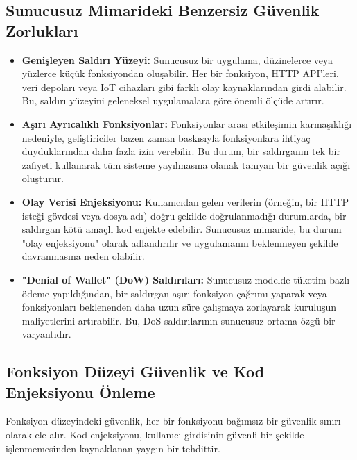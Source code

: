 \subsection{Sunucusuz Mimarideki Benzersiz Güvenlik Zorlukları}
\begin{itemize}
    \item \textbf{Genişleyen Saldırı Yüzeyi:} Sunucusuz bir uygulama, düzinelerce veya yüzlerce küçük fonksiyondan oluşabilir. Her bir fonksiyon, HTTP API'leri, veri depoları veya IoT cihazları gibi farklı olay kaynaklarından girdi alabilir. Bu, saldırı yüzeyini geleneksel uygulamalara göre önemli ölçüde artırır.
    \item \textbf{Aşırı Ayrıcalıklı Fonksiyonlar:} Fonksiyonlar arası etkileşimin karmaşıklığı nedeniyle, geliştiriciler bazen zaman baskısıyla fonksiyonlara ihtiyaç duyduklarından daha fazla izin verebilir. Bu durum, bir saldırganın tek bir zafiyeti kullanarak tüm sisteme yayılmasına olanak tanıyan bir güvenlik açığı oluşturur.
    \item \textbf{Olay Verisi Enjeksiyonu:} Kullanıcıdan gelen verilerin (örneğin, bir HTTP isteği gövdesi veya dosya adı) doğru şekilde doğrulanmadığı durumlarda, bir saldırgan kötü amaçlı kod enjekte edebilir. Sunucusuz mimaride, bu durum "olay enjeksiyonu" olarak adlandırılır ve uygulamanın beklenmeyen şekilde davranmasına neden olabilir.
    \item \textbf{"Denial of Wallet" (DoW) Saldırıları:} Sunucusuz modelde tüketim bazlı ödeme yapıldığından, bir saldırgan aşırı fonksiyon çağrımı yaparak veya fonksiyonları beklenenden daha uzun süre çalışmaya zorlayarak kuruluşun maliyetlerini artırabilir. Bu, DoS saldırılarının sunucusuz ortama özgü bir varyantıdır.
\end{itemize}

\subsection{Fonksiyon Düzeyi Güvenlik ve Kod Enjeksiyonu Önleme}
Fonksiyon düzeyindeki güvenlik, her bir fonksiyonu bağımsız bir güvenlik sınırı olarak ele alır. Kod enjeksiyonu, kullanıcı girdisinin güvenli bir şekilde işlenmemesinden kaynaklanan yaygın bir tehdittir.

